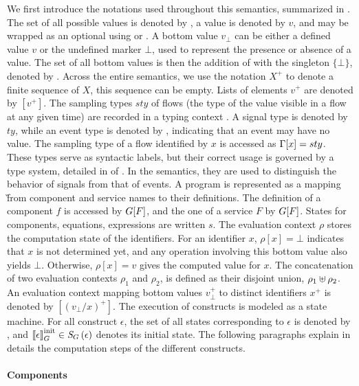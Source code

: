 We first introduce the notations used throughout this semantics, summarized in
.
%
The set of all possible values is denoted by \Val, a value is denoted by $v$, and may be wrapped as
an optional using  or \none.
%
A bottom value $v_\bot$ can be either a defined value $v$ or the undefined marker $\bot$, used to
represent the presence or absence of a value. The set of all bottom values is then the addition of
\Val with the singleton $\{\bot\}$, denoted by \ValBot.
%
Across the entire semantics, we use the notation $X^+$ to denote a finite sequence of $X$, this
sequence can be empty.
%
Lists of elements $v^+$ are denoted by $[v^+]$.
%
The sampling types $sty$ of flows (\ie the type of the value visible in a flow at any given time)
are recorded in a typing context \tyCtx. A signal type is denoted by $ty$, while an event type is
denoted by , indicating that an event may have no value. The sampling type of a flow
identified by $x$ is accessed as $\Gamma[x] = sty$. These types serve as syntactic labels, but their
correct usage is governed by a type system, detailed in  of .
In the semantics, they are used to distinguish the behavior of signals from that of events.
%
A program is represented as a mapping \G from component and service names to their definitions.
The definition of a component $f$ is accessed by $G[F]$, and the one of a service $F$ by $G[F]$.
%
States for components, equations, expressions are written $s$.
%
The evaluation context $\rho$ stores the computation state of the identifiers. For an identifier
$x$, $\rho[x] = \bot$ indicates that $x$ is not determined yet, and any operation involving this
bottom value also yields $\bot$. Otherwise, $\rho[x] = v$ gives the computed value for $x$.
%
The concatenation of two evaluation contexts $\rho_1$ and $\rho_2$, is defined as their disjoint
union, $\rho_1 \uplus \rho_2$. An evaluation context mapping bottom values $v_\bot^+$ to
distinct identifiers $x^+$ is denoted by $[(v_\bot/x)^+]$.
%
The execution of \GRSync constructs is modeled as a state machine.
For all \GRSync construct $\epsilon$, the set of all states corresponding to $\epsilon$ is denoted
by \stateTy{\epsilon}, and $\left\llbracket \epsilon \right\rrbracket_G^\text{init} \in \textit{S}_{G}\left(\epsilon\right)$ denotes its initial state.
The following paragraphs explain in details the computation steps of the different constructs.

\paragraph{Components}

